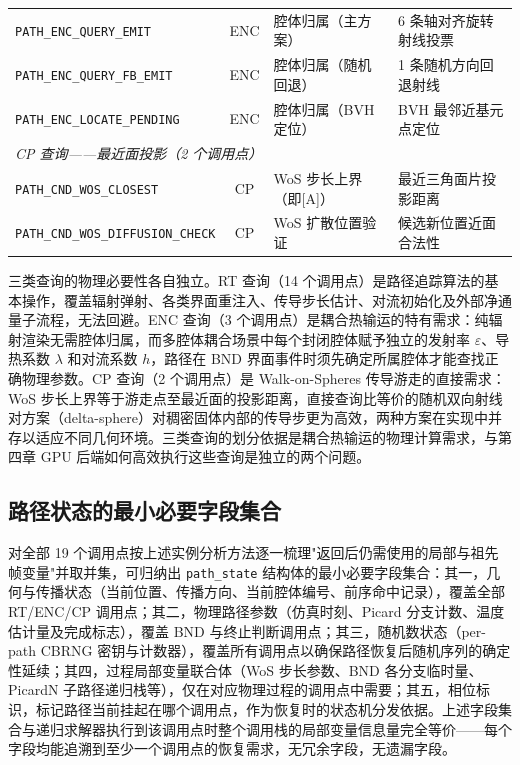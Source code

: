 \begin{table}[htbp]
\begin{tabular}{p{4.6cm}cll}
    \midrule
    \texttt{PATH\_ENC\_QUERY\_EMIT}            & ENC & 腔体归属（主方案）& 6 条轴对齐旋转射线投票 \\
    \texttt{PATH\_ENC\_QUERY\_FB\_EMIT}        & ENC & 腔体归属（随机回退）& 1 条随机方向回退射线 \\
    \texttt{PATH\_ENC\_LOCATE\_PENDING}        & ENC & 腔体归属（BVH 定位）& BVH 最邻近基元点定位 \\
    \midrule
    \multicolumn{4}{l}{\textit{CP 查询——最近面投影（2 个调用点）}} \\
    \midrule
    \texttt{PATH\_CND\_WOS\_CLOSEST}           & CP & WoS 步长上界（即[A]）& 最近三角面片投影距离 \\
    \texttt{PATH\_CND\_WOS\_DIFFUSION\_CHECK}  & CP & WoS 扩散位置验证  & 候选新位置近面合法性 \\
    \bottomrule
  \end{tabular}
\end{table}

三类查询的物理必要性各自独立。RT 查询（14 个调用点）是路径追踪算法的基本操作，覆盖辐射弹射、各类界面重注入、传导步长估计、对流初始化及外部净通量子流程，无法回避。ENC 查询（3 个调用点）是耦合热输运的特有需求：纯辐射渲染无需腔体归属，而多腔体耦合场景中每个封闭腔体赋予独立的发射率 $\varepsilon$、导热系数 $\lambda$ 和对流系数 $h$，路径在 BND 界面事件时须先确定所属腔体才能查找正确物理参数。CP 查询（2 个调用点）是 Walk-on-Spheres 传导游走的直接需求：WoS 步长上界等于游走点至最近面的投影距离，直接查询比等价的随机双向射线对方案（delta-sphere）对稠密固体内部的传导步更为高效，两种方案在实现中并存以适应不同几何环境。三类查询的划分依据是耦合热输运的物理计算需求，与第四章 GPU 后端如何高效执行这些查询是独立的两个问题。

\subsection{路径状态的最小必要字段集合}

对全部 19 个调用点按上述实例分析方法逐一梳理"返回后仍需使用的局部与祖先帧变量"并取并集，可归纳出 \texttt{path\_state} 结构体的最小必要字段集合：其一，几何与传播状态（当前位置、传播方向、当前腔体编号、前序命中记录），覆盖全部 RT/ENC/CP 调用点；其二，物理路径参数（仿真时刻、Picard 分支计数、温度估计量及完成标志），覆盖 BND 与终止判断调用点；其三，随机数状态（per-path CBRNG 密钥与计数器），覆盖所有调用点以确保路径恢复后随机序列的确定性延续；其四，过程局部变量联合体（WoS 步长参数、BND 各分支临时量、PicardN 子路径递归栈等），仅在对应物理过程的调用点中需要；其五，相位标识，标记路径当前挂起在哪个调用点，作为恢复时的状态机分发依据。上述字段集合与递归求解器执行到该调用点时整个调用栈的局部变量信息量完全等价——每个字段均能追溯到至少一个调用点的恢复需求，无冗余字段，无遗漏字段。

